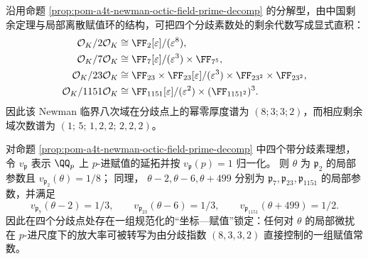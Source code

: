 \begin{corollary}[剩余代数分解与幂零厚度]\label{cor:pom-a4t-newman-octic-field-residue-algebra}
沿用命题 \ref{prop:pom-a4t-newman-octic-field-prime-decomp} 的分解型，由中国剩余定理与局部离散赋值环的结构，可把四个分歧素数处的剩余代数写成显式直积：
\begin{align*}
\mathcal O_K/2\mathcal O_K &\cong \FF_2[\varepsilon]/(\varepsilon^8),\\
\mathcal O_K/7\mathcal O_K &\cong \FF_7[\varepsilon]/(\varepsilon^3)\times \FF_{7^5},\\
\mathcal O_K/23\mathcal O_K &\cong \FF_{23}\times \FF_{23}[\varepsilon]/(\varepsilon^3)\times \FF_{23^2}\times \FF_{23^2},\\
\mathcal O_K/1151\mathcal O_K &\cong \FF_{1151}[\varepsilon]/(\varepsilon^2)\times (\FF_{1151^2})^{3}.
\end{align*}
因此该 Newman 临界八次域在分歧点上的幂零厚度谱为 \((8;3;3;2)\)，而相应剩余域次数谱为 \((1;\,5;\,1,2,2;\,2,2,2)\)。
\end{corollary}

\begin{remark}[规范化局部参数与赋值标度]\label{rem:pom-a4t-newman-octic-field-local-parameters}
对命题 \ref{prop:pom-a4t-newman-octic-field-prime-decomp} 中四个带分歧素理想，令 \(v_{\mathfrak p}\) 表示 \(\QQ_p\) 上 \(p\)-进赋值的延拓并按 \(v_{\mathfrak p}(p)=1\) 归一化。
则 \(\theta\) 为 \(\mathfrak p_2\) 的局部参数且
\(
v_{\mathfrak p_2}(\theta)=1/8
\)；
同理，
\(
\theta-2,\theta-6,\theta+499
\)
分别为 \(\mathfrak p_7,\mathfrak p_{23},\mathfrak p_{1151}\) 的局部参数，并满足
\[
v_{\mathfrak p_7}(\theta-2)=1/3,\qquad
v_{\mathfrak p_{23}}(\theta-6)=1/3,\qquad
v_{\mathfrak p_{1151}}(\theta+499)=1/2.
\]
因此在四个分歧点处存在一组规范化的“坐标—赋值”锁定：任何对 \(\theta\) 的局部微扰在 \(p\)-进尺度下的放大率可被转写为由分歧指数 \((8,3,3,2)\) 直接控制的一组赋值常数。
\end{remark}

